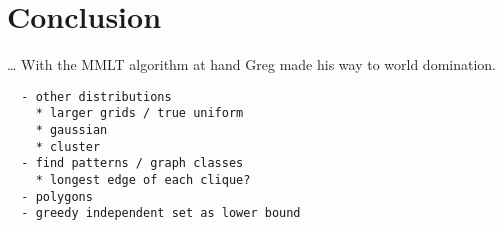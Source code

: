 \chapter{Conclusion}
\ldots{}
With the \gls{MMLT} algorithm at hand Greg made his way to world domination.

\begin{verbatim}
  - other distributions
    * larger grids / true uniform
    * gaussian
    * cluster
  - find patterns / graph classes
    * longest edge of each clique?
  - polygons
  - greedy independent set as lower bound 
\end{verbatim}

